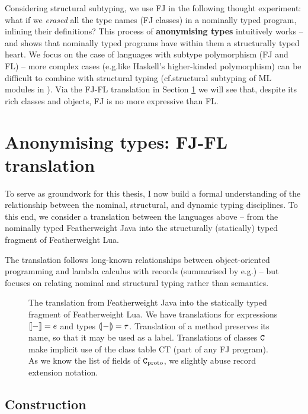 Considering structural subtyping, we use FJ in the following thought experiment: what if we \emph{erased} all the type names (FJ classes) in a nominally typed program, inlining their definitions? This process of \textbf{anonymising types} intuitively works -- and shows that nominally typed programs have within them a structurally typed heart. We focus on the case of languages with subtype polymorphism (FJ and FL) -- more complex cases (e.g.\@ like Haskell's higher-kinded polymorphism) can be difficult to combine with structural typing (cf.\@ structural subtyping of ML modules in \textcite{modular-implicits}).
Via the FJ-FL translation in Section \ref{sec:translations} we will see that, despite its rich classes and objects, FJ is no more expressive than FL.

\section{Anonymising types: FJ-FL translation}
\label{sec:translations}

To serve as groundwork for this thesis, I now build a formal understanding of the relationship between the nominal, structural, and dynamic typing disciplines. To this end, we consider a translation between the languages above -- from the nominally typed Featherweight Java into the structurally (statically) typed fragment of Featherweight Lua. 

The translation follows long-known relationships between object-oriented programming and lambda calculus with records (summarised by e.g.\@ \textcite{pierce-thesis}) -- but focuses on relating nominal and structural typing rather than semantics.


\begin{figure}
    \centering
    
    \caption{The translation from Featherweight Java into the statically typed fragment of Featherweight Lua. We have translations for expressions $\denot{-} = e$ and types $\denoty{-} = \tau$. Translation of a method preserves its name, so that it may be used as a label. Translations of classes $\texttt{C}$ make implicit use of the class table $\mathrm{CT}$ (part of any FJ program). As we know the list of fields of $\texttt{C}_\mathrm{proto}$, we slightly abuse record extension notation.}
    \label{fig:translation}
\end{figure}

\subsection{Construction}

